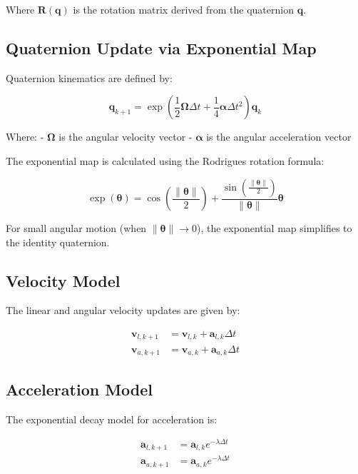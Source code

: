 \documentclass{article}
\begin{document}
	Where $\mathbf{R}(\mathbf{q})$ is the rotation matrix derived from the quaternion $\mathbf{q}$.

	\subsection{Quaternion Update via Exponential Map}
	Quaternion kinematics are defined by:

	\begin{equation}
		\mathbf{q}_{k+1} = \exp\left(\frac{1}{2} \mathbf{\Omega} \Delta t + \frac{1}{4} \mathbf{\alpha} \Delta t^2\right) \mathbf{q}_k
	\end{equation}

	Where:
	- $\mathbf{\Omega}$ is the angular velocity vector
	- $\mathbf{\alpha}$ is the angular acceleration vector

	The exponential map is calculated using the Rodrigues rotation formula:

	\begin{equation}
		\exp(\bm{\theta}) = \cos\left(\frac{\|\bm{\theta}\|}{2}\right) + \frac{\sin\left(\frac{\|\bm{\theta}\|}{2}\right)}{\|\bm{\theta}\|} \bm{\theta}
	\end{equation}

	For small angular motion (when $\|\bm{\theta}\| \to 0$), the exponential map simplifies to the identity quaternion.

	\subsection{Velocity Model}
	The linear and angular velocity updates are given by:

	\begin{align*}
		\mathbf{v}_{l,k+1} &= \mathbf{v}_{l,k} + \mathbf{a}_{l,k} \Delta t \\
		\mathbf{v}_{a,k+1} &= \mathbf{v}_{a,k} + \mathbf{a}_{a,k} \Delta t
	\end{align*}

	\subsection{Acceleration Model}
	The exponential decay model for acceleration is:

	\begin{align*}
		\mathbf{a}_{l,k+1} &= \mathbf{a}_{l,k} e^{-\lambda \Delta t} \\
		\mathbf{a}_{a,k+1} &= \mathbf{a}_{a,k} e^{-\lambda \Delta t}
	\end{align*}
\end{document}
